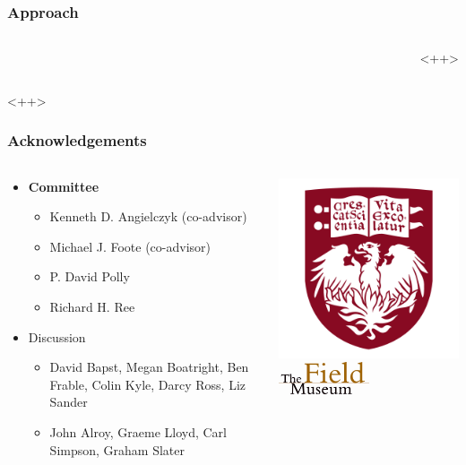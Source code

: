 \documentclass{beamer}
\begin{document}
\begin{frame}
  \frametitle{Approach}
  \begin{columns}
    \begin{column}{0.5\textwidth}
      
    \end{column}<++>
  \end{columns}<++>
\end{frame}

\begin{frame}
  \frametitle{Acknowledgements}
  \begin{columns}
    \begin{column}{0.5\textwidth}
      \begin{itemize}
        \item \textbf{Committee}
          \begin{itemize}
            \item Kenneth D. Angielczyk (co-advisor)
            \item Michael J. Foote (co-advisor)
            \item P. David Polly
            \item Richard H. Ree
          \end{itemize}
        \item Discussion
          \begin{itemize}
            \item David Bapst, Megan Boatright, Ben Frable, Colin Kyle, Darcy Ross, Liz Sander
            \item John Alroy, Graeme Lloyd, Carl Simpson, Graham Slater
          \end{itemize}
      \end{itemize}
    \end{column}
    \begin{column}{0.5\textwidth}
      \includegraphics[height = 0.3\textheight, keepaspectratio = true]{figure/chicago} \\
      \includegraphics[height = 0.3\textheight, width = 0.5\textwidth, keepaspectratio = true]{figure/field} \\
    \end{column}
  \end{columns}
\end{frame}
\end{document}
